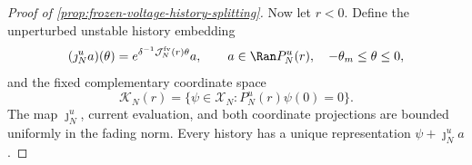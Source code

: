 \begin{proof}[Proof of \cref{prop:frozen-voltage-history-splitting}]
Now let \(r<0\).  Define the unperturbed unstable history embedding
\begin{equation}
 (\jmath_N^ua)(\theta)
 =e^{\delta^{-1}\mathcal J_N^{\rm fv}(r)\theta}a,\qquad
 a\in\Ran P_N^u(r),\quad -\theta_m\le\theta\le0,    \label{eq:frozen-base-unstable-embedding}
\end{equation}
and the fixed complementary coordinate space
\begin{equation}
 \mathscr K_N(r)=\{\psi\in\mathscr X_N:
                         P_N^u(r)\psi(0)=0\}.       \label{eq:frozen-base-stable-coordinate}
\end{equation}
The map \(\jmath_N^u\), current evaluation, and both coordinate
projections are bounded uniformly in the fading norm.  Every history has a
unique representation \(\psi+\jmath_N^ua\).


\end{proof}

